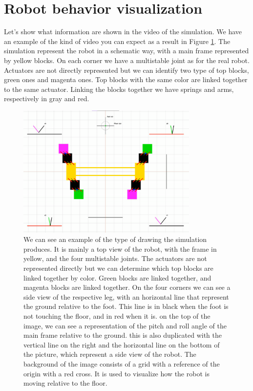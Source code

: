     \section{Robot behavior visualization}
        Let's show what information are shown in the video of the simulation. We have an example of the kind of video you can expect as a result in Figure \ref{fig:drawing}. The simulation represent the robot in a schematic way, with a main frame represented by yellow blocks. On each corner we have a multistable joint as for the real robot. Actuators are not directly represented but we can identify two type of top blocks, green ones and magenta ones. Top blocks with the same color are linked together to the same actuator. Linking the blocks together we have springs and arms, respectively in gray and red. 
        
        \begin{figure}[h]
            \centering
            \includegraphics[width=0.8\textwidth]{images/drawing.png}
            \caption{We can see an example of the type of drawing the simulation produces. It is mainly a top view of the robot, with the frame in yellow, and the four multistable joints. The actuators are not represented directly but we can determine which top blocks are linked together by color. Green blocks are linked together, and magenta blocks are linked together. On the four corners we can see a side view of the respective leg, with an horizontal line that represent the ground relative to the foot. This line is in black when the foot is not touching the floor, and in red when it is. on the top of the image, we can see a representation of the pitch and roll angle of the main frame relative to the ground. this is also duplicated with the vertical line on the right and the horizontal line on the bottom of the picture, which represent a side view of the robot. The background of the image consists of a grid with a reference of the origin with a red cross. It is used to visualize how the robot is moving relative to the floor.}
            \label{fig:drawing}
        \end{figure}
        
